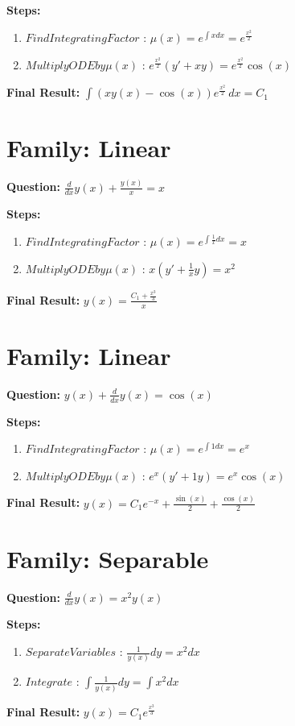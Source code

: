 \documentclass{article}
\begin{document}
\textbf{Steps:}
\begin{enumerate}
\item $Find Integrating Factor$ :  $\mu(x) = e^{\int x dx} = e^{\frac{x^{2}}{2}}$
\item $Multiply ODE by \mu(x)$ :  $e^{\frac{x^{2}}{2}}(y' + xy) = e^{\frac{x^{2}}{2}} \cos{\left(x \right)}$
\end{enumerate}
\textbf{Final Result:} $\int \left(x y{\left(x \right)} - \cos{\left(x \right)}\right) e^{\frac{x^{2}}{2}}\, dx = C_{1}$

\section*{Family: Linear}
\textbf{Question:} $\frac{d}{d x} y{\left(x \right)} + \frac{y{\left(x \right)}}{x} = x$

\textbf{Steps:}
\begin{enumerate}
\item $Find Integrating Factor$ :  $\mu(x) = e^{\int \frac{1}{x} dx} = x$
\item $Multiply ODE by \mu(x)$ :  $x(y' + \frac{1}{x}y) = x^{2}$
\end{enumerate}
\textbf{Final Result:} $y{\left(x \right)} = \frac{C_{1} + \frac{x^{3}}{3}}{x}$

\section*{Family: Linear}
\textbf{Question:} $y{\left(x \right)} + \frac{d}{d x} y{\left(x \right)} = \cos{\left(x \right)}$

\textbf{Steps:}
\begin{enumerate}
\item $Find Integrating Factor$ :  $\mu(x) = e^{\int 1 dx} = e^{x}$
\item $Multiply ODE by \mu(x)$ :  $e^{x}(y' + 1y) = e^{x} \cos{\left(x \right)}$
\end{enumerate}
\textbf{Final Result:} $y{\left(x \right)} = C_{1} e^{- x} + \frac{\sin{\left(x \right)}}{2} + \frac{\cos{\left(x \right)}}{2}$

\section*{Family: Separable}
\textbf{Question:} $\frac{d}{d x} y{\left(x \right)} = x^{2} y{\left(x \right)}$

\textbf{Steps:}
\begin{enumerate}
\item $Separate Variables$ :  $\frac{1}{y{\left(x \right)}} dy = x^{2} dx$
\item $Integrate$ :  $\int \frac{1}{y{\left(x \right)}} dy = \int x^{2} dx$
\end{enumerate}
\textbf{Final Result:} $y{\left(x \right)} = C_{1} e^{\frac{x^{3}}{3}}$
\end{document}
